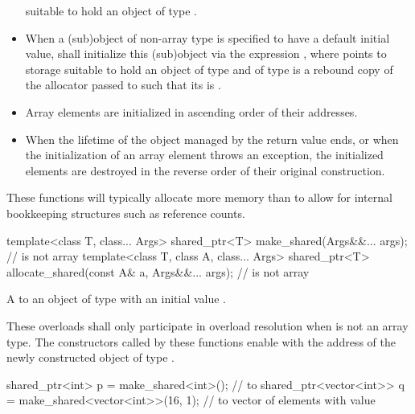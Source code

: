 \begin{itemdescr}
\begin{itemize}
  suitable to hold an object of type .
\item
  When a (sub)object of non-array type  is specified to have
  a default initial value,
   shall initialize this (sub)object
  via the expression ,
  where  points to storage
  suitable to hold an object of type  and
   of type  is a rebound copy of
  the allocator  passed to 
  such that its  is .
\item
  Array elements are initialized in ascending order of their addresses.
\item
  When the lifetime of the object managed by the return value ends, or
  when the initialization of an array element throws an exception,
  the initialized elements are destroyed in the reverse order
  of their original construction.
\end{itemize}
\begin{note}
These functions will typically allocate more memory than  to
allow for internal bookkeeping structures such as reference counts.
\end{note}
\end{itemdescr}

%
%
\begin{itemdecl}
template<class T, class... Args>
  shared_ptr<T> make_shared(Args&&... args);                    //  is not array
template<class T, class A, class... Args>
  shared_ptr<T> allocate_shared(const A& a, Args&&... args);    //  is not array
\end{itemdecl}

\begin{itemdescr}
\pnum
\returns A  to an object of type 
with an initial value .

\pnum
\remarks These overloads shall only participate in overload resolution
when  is not an array type.
The  constructors called by these functions
enable 
with the address of the newly constructed object of type .

\pnum
\begin{example}
\begin{codeblock}
shared_ptr<int> p = make_shared<int>(); //  to 
shared_ptr<vector<int>> q = make_shared<vector<int>>(16, 1);
  //  to vector of  elements with value 
\end{codeblock}
\end{example}
\end{itemdescr}


